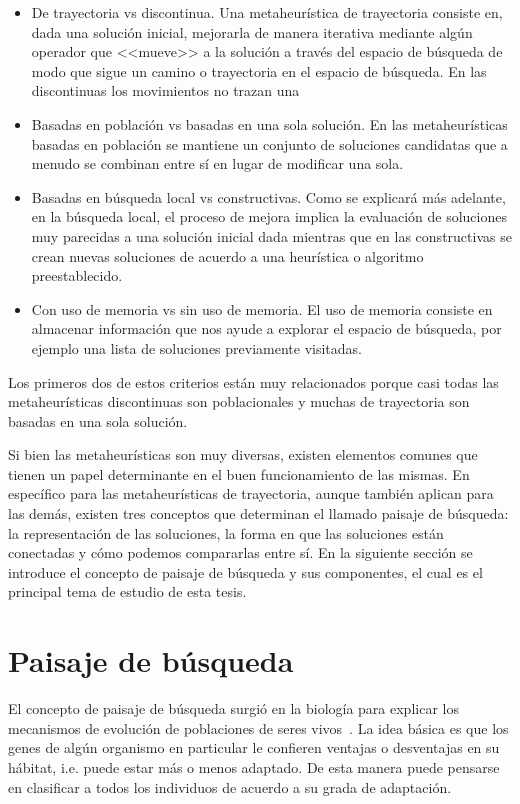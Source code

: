 \begin{itemize}
\item De trayectoria vs discontinua. Una metaheurística de trayectoria consiste en, dada una solución inicial, mejorarla de manera iterativa mediante algún operador que <<mueve>> a la solución a través del espacio de búsqueda de modo que sigue un camino o trayectoria en el espacio de búsqueda. En las discontinuas los movimientos no trazan una 
\item Basadas en población vs basadas en una sola solución. En las metaheurísticas basadas en población se mantiene un conjunto de soluciones candidatas que a menudo se combinan entre sí en lugar de modificar una sola.
\item Basadas en búsqueda local vs constructivas. Como se explicará más adelante, en la búsqueda local, el proceso de mejora implica la evaluación de soluciones muy parecidas a una solución inicial dada mientras que en las constructivas se crean nuevas soluciones de acuerdo a una heurística o algoritmo preestablecido.
\item Con uso de memoria vs sin uso de memoria. El uso de memoria consiste en almacenar información que nos ayude a explorar el espacio de búsqueda, por ejemplo una lista de soluciones previamente visitadas.
\end{itemize} 
Los primeros dos de estos criterios están muy relacionados porque casi todas las metaheurísticas discontinuas son poblacionales y muchas de trayectoria son basadas en una sola solución.


Si bien las metaheurísticas son muy diversas, existen elementos comunes que tienen un papel determinante en el buen funcionamiento de las mismas. 
%
En específico para las metaheurísticas de trayectoria, aunque también aplican para las demás, existen tres conceptos que determinan el llamado paisaje de búsqueda: 
la representación de las soluciones, la forma en que las soluciones están conectadas y cómo podemos compararlas entre sí. 
%
En la siguiente sección se introduce el concepto de paisaje de búsqueda y sus componentes, el cual es el principal tema de estudio de esta tesis.

\section{Paisaje de búsqueda}
El concepto de paisaje de búsqueda surgió en la biología para explicar los mecanismos de evolución de poblaciones de seres vivos~\cite{wright1932roles}. 
%
La idea básica es que los genes de algún organismo en particular le confieren ventajas o desventajas en su hábitat, i.e. puede estar más o menos adaptado. 
%
De esta manera puede pensarse en clasificar a todos los individuos de acuerdo a su grada de adaptación. 

